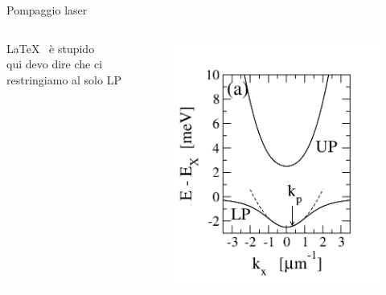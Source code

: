 \documentclass[10pt]{beamer}
\begin{document}
\begin{frame}{Pompaggio laser}

\begin{columns}
\hskip10pt
\begin{column}{.4\textwidth}
      
\LaTeX~ è stupido\\
qui devo dire che ci restringiamo al solo LP

  \end{column}
  
  \begin{column}{.6\textwidth}
      \begin{figure}
       \includegraphics[scale=.3]{files/LP_pump.png}
      \end{figure}
  \end{column}   
 
\end{columns}

\end{frame}
\end{document}

